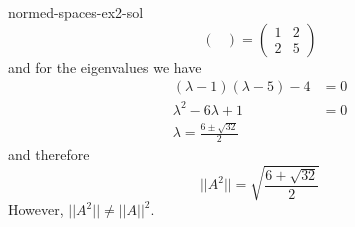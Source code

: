 \documentclass[preview]{standalone}
\begin{document}
\begin{snippetsolution}{normed-spaces-ex2-sol}{}
\[\begin{pmatrix}
        \end{pmatrix}
        = \begin{pmatrix}
            1 & 2 \\ 2 & 5
        \end{pmatrix}
    \]
    and for the eigenvalues we have \begin{align*}
        (\lambda - 1)(\lambda-5)-4 &= 0 \\
        \lambda^2 - 6\lambda + 1 &= 0 \\
        \lambda = \frac{6\pm \sqrt{32}}{2}
    \end{align*}
    and therefore
    \[
        {||A^2||} = \sqrt{
            \frac{6 + \sqrt{32}}{2}
        }
    \]
    However, \(||A^2|| \neq {||A||}^2\).
\end{snippetsolution}
\end{document}
